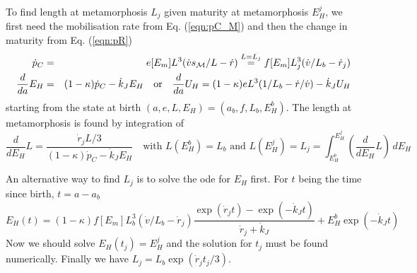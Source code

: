 To find length at metamorphosis $L_j$ given maturity at metamorphosis $E_H^j$, we first need the mobilisation rate from Eq. (\ref{eqn:pC_M}) and then the change in maturity from Eq. (\ref{eqn:pR})
\begin{eqnarray*}
  \dot{p}_C &=& e [E_m] L^3 (\dot{v} s_{\cal M}/ L - \dot{r}) \stackrel{L = L_j} {=} f [E_m] L_j^3 (\dot{v}/ L_b -\dot{r}_j)
  \\
  \frac{d} {da} E_H &=& (1 - \kappa) \dot{p}_C - \dot{k}_J E_H \quad \mbox{or} \quad
	\frac{d} {da} U_H  =  (1 - \kappa) e L^3 (1/ L_b - \dot{r}/ \dot{v}) - \dot{k}_J U_H
\end{eqnarray*}
starting from the state at birth $(a, e, L, E_H) = (a_b, f, L_b, E_H^b)$.
The length at metamorphosis is found by integration of
\[
  \frac{d} {d E_H} L = \frac{\dot{r}_j L/ 3} {(1 - \kappa) \dot{p}_C - \dot{k}_J E_H} 
  \quad \mbox{with } L(E_H^b) = L_b \mbox{ and }
  L(E_H^j) = L_j = \int_{E_H^b}^{E_H^j} \left( \frac{d} {d E_H} L \right) \, d E_H
\]

An alternative way to find $L_j$ is to solve the {\sc ode} for $E_H$ first.
For $t$ being the time since birth, $t = a - a_b$
\[
  E_H(t) = (1 - \kappa) f [E_m] L_b^3 (\dot{v}/ L_b - \dot{r}_j)
  \frac{\exp( \dot{r}_j t) - \exp( - \dot{k}_J t)}{\dot{r}_j + \dot{k}_J} + E_H^b \exp(- \dot{k}_J t)
\]
Now we should solve $E_H(t_j) = E_H^j$ and the solution for $t_j$ must be found numerically.
Finally we have $L_j = L_b \exp(\dot{r}_j t_j/ 3)$.

